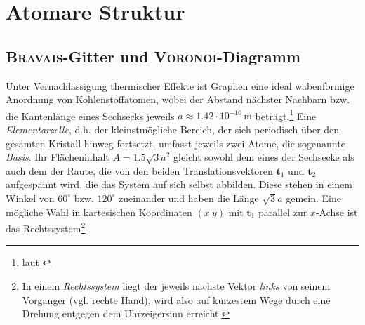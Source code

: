 \documentclass[a4paper, 10pt, twoside, openany]{book} %
\def \vec {\boldsymbol}
\begin{document}
	\section{Atomare Struktur}
	\label{Atomare Struktur}
	
	\subsection{\textsc{Bravais}-Gitter und \textsc{Voronoi}-Diagramm}
	\label{Bravais-Gitter}
	
	Unter Vernachlässigung thermischer Effekte ist Graphen eine ideal wabenförmige Anordnung von Kohlenstoffatomen, wobei der Abstand nächster Nachbarn bzw. die Kantenlänge eines Sechsecks jeweils $a \approx 1.42 \cdot 10^{-10}\,\mathrm{m}$ beträgt.\footnote{laut \cite[S.~6]{Katsnelson1}} Eine \emph{Elementarzelle}, d.h. der kleinstmögliche Bereich, der sich periodisch über den gesamten Kristall hinweg fortsetzt, umfasst jeweils zwei Atome, die sogenannte \emph{Basis}. Ihr Flächeninhalt $A = 1.5 \sqrt{3} a^2$ gleicht sowohl dem eines der Sechsecke als auch dem der Raute, die von den beiden Translationsvektoren $\vec t_1$ und $\vec t_2$ aufgespannt wird, die das System auf sich selbst abbilden. Diese stehen in einem Winkel von $60^\circ$ bzw. $120^\circ$ zueinander und haben die Länge $\sqrt 3 a$ gemein. Eine mögliche Wahl in kartesischen Koordinaten $(x \ y)$ mit $\vec t_1$ parallel zur $x$-Achse ist das Rechtssystem\footnote{In einem \emph{Rechtssystem} liegt der jeweils nächste Vektor \emph{links} von seinem Vorgänger (vgl. rechte Hand), wird also auf kürzestem Wege durch eine Drehung entgegen dem Uhrzeigersinn erreicht.}
\end{document}
